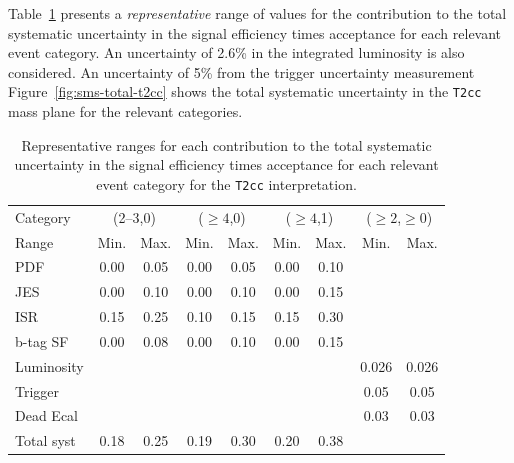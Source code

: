 Table~\ref{tab:sms-syst-t2cc} presents a {\it representative} range of
values for the contribution to the total systematic uncertainty in the
signal efficiency times acceptance for each relevant event
category. An uncertainty of 2.6\% in the integrated luminosity is also
considered. An uncertainty of 5\% from the trigger uncertainty measurement
Figure~\ref{fig:sms-total-t2cc} shows the total systematic uncertainty 
in the \verb!T2cc! mass plane for the relevant categories.

\begin{table}[h!]
  \caption{Representative ranges for each contribution to the total
    systematic uncertainty in the signal efficiency times acceptance
    for each relevant event category for the \texttt{T2cc}
    interpretation.
    \label{tab:sms-syst-t2cc}
  }   
  \centering
  \begin{tabular}{ lcccccccc }
    \hline
    \hline
    Category   & \multicolumn{2}{c}{(2--3,0)} & \multicolumn{2}{c}{($\geq 4$,0)} & \multicolumn{2}{c}{($\geq 4$,1)} & \multicolumn{2}{c}{($\geq 2$,$\geq 0$)} \\
    Range      & Min.   & Max.                & Min.   & Max.                    & Min. & Max.                      & Min.  & Max.        \\
    \hline
    PDF        & 0.00   & 0.05                & 0.00   & 0.05                    & 0.00 & 0.10                      &         \\
    JES        & 0.00   & 0.10                & 0.00   & 0.10                    & 0.00 & 0.15 	                    &             \\
    ISR        & 0.15   & 0.25                & 0.10   & 0.15                    & 0.15 & 0.30 	                    &             \\
    b-tag SF   & 0.00   & 0.08                & 0.00   & 0.10                    & 0.00 & 0.15 	                    &             \\
    Luminosity &        &                     &        &                         &      &      	                    & 0.026 & 0.026        \\
    Trigger    &        &                     &        &                         &      &                           & 0.05 & 0.05        \\
    Dead Ecal  &        &                     &        &                         &      &      	                    & 0.03 & 0.03        \\
    \hline
    Total syst & 0.18   & 0.25                & 0.19   & 0.30                    & 0.20 & 0.38                      &      &             \\
    \hline
    \hline
  \end{tabular}
\end{table}


